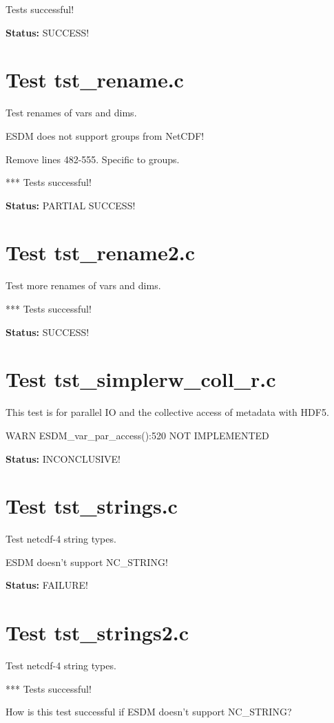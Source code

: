 Tests successful!

{\bf \large Status: } SUCCESS!

\section{Test tst\_rename.c}

Test renames of vars and dims.

ESDM does not support groups from NetCDF!

Remove lines 482-555. Specific to groups.

*** Tests successful!

{\bf \large Status: } PARTIAL SUCCESS!

\section{Test tst\_rename2.c}

Test more renames of vars and dims.

*** Tests successful!

{\bf \large Status: } SUCCESS!

\section{Test tst\_simplerw\_coll\_r.c}

This test is for parallel IO and the collective access of metadata with HDF5.

WARN ESDM\_var\_par\_access():520 NOT IMPLEMENTED

{\bf \large Status: } INCONCLUSIVE!

\section{Test tst\_strings.c}

Test netcdf-4 string types.

ESDM doesn't support NC\_STRING!

{\bf \large Status: } FAILURE!

\section{Test tst\_strings2.c}

Test netcdf-4 string types.

*** Tests successful!

How is this test successful if ESDM doesn't support NC\_STRING?

